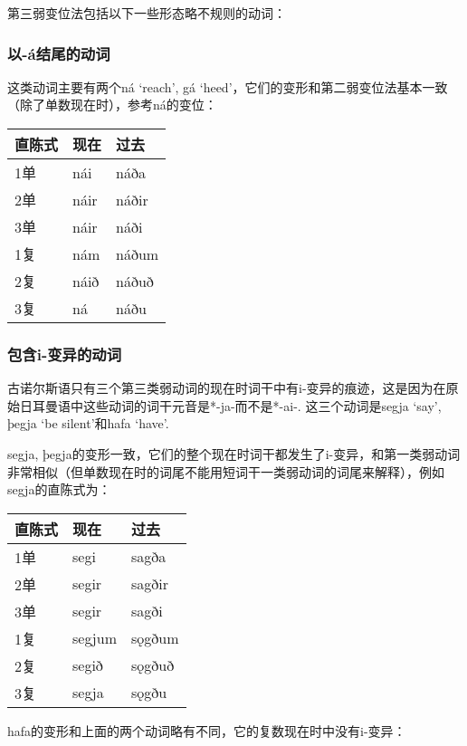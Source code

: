 第三弱变位法包括以下一些形态略不规则的动词：


\subsubsection{以-á结尾的动词}


这类动词主要有两个ná `reach', gá
`heed'，它们的变形和第二弱变位法基本一致（除了单数现在时），参考ná的变位：

\begin{longtable}{lll}
    \toprule
    直陈式 & 现在   & 过去    \\
    \midrule
    \endhead
    \bottomrule
    \endfoot
    1单  & nái  & náða  \\
    2单  & náir & náðir \\
    3单  & náir & náði  \\
    1复  & nám  & náðum \\
    2复  & náið & náðuð \\
    3复  & ná   & náðu  \\
\end{longtable}


\subsubsection{包含i-变异的动词}


古诺尔斯语只有三个第三类弱动词的现在时词干中有i-变异的痕迹，这是因为在原始日耳曼语中这些动词的词干元音是*-ja-而不是*-ai-.
这三个动词是segja `say', þegja `be silent'和hafa `have'.

segja, þegja的变形一致，它们的整个现在时词干都发生了i-变异，和第一类弱动词非常相似（但单数现在时的词尾不能用短词干一类弱动词的词尾来解释），例如segja的直陈式为：

\begin{longtable}{lll}
    \toprule
    直陈式 & 现在     & 过去     \\
    \midrule
    \endhead
    \bottomrule
    \endfoot
    1单  & segi   & sagða  \\
    2单  & segir  & sagðir \\
    3单  & segir  & sagði  \\
    1复  & segjum & sǫgðum \\
    2复  & segið  & sǫgðuð \\
    3复  & segja  & sǫgðu  \\
\end{longtable}

hafa的变形和上面的两个动词略有不同，它的复数现在时中没有i-变异：

